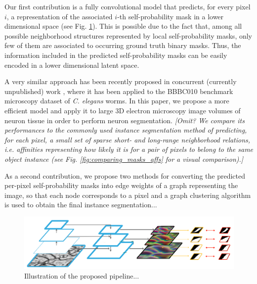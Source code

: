 Our first contribution is a fully convolutional model that predicts, for every pixel $i$, a representation of the associated $i$-th self-probability mask in a lower dimensional space (see Fig. \ref{fig:main_figure}). This is possible due to the fact that, among all possible neighborhood structures represented by local self-probability masks, only few of them are associated to occurring ground truth binary masks. Thus, the information included in the predicted self-probability masks can be easily encoded in a lower dimensional latent space. 

A very similar approach has been recently proposed in concurrent (currently unpublished) work \cite{hirsch2020patchperpix}, where it has been applied to the BBBC010 benchmark microscopy dataset of \emph{C. elegans} worms. In this paper, we propose a more efficient model and apply it to large 3D electron microscopy image volumes of neuron tissue in order to perform neuron segmentation. 
\emph{[Omit? We compare its performances to the commonly used instance segmentation method of predicting, for each pixel, a small set of sparse short- and long-range neighborhood relations, i.e. affinities representing how likely it is for a pair of pixels to belong to the same object instance (see Fig. \ref{fig:comparing_masks_affs} for a visual comparison).]}

As a second contribution, we propose two methods for converting the predicted per-pixel self-probability masks into edge weights of a graph representing the image, so that each node corresponds to a pixel and a graph clustering algorithm is used to obtain the final instance segmentation... 

\begin{figure}[t]
\centering
        \includegraphics[width=\textwidth]{./figs/main_image.pdf} %
        \caption{Illustration of the proposed pipeline...}
    \label{fig:main_figure}
\end{figure}


